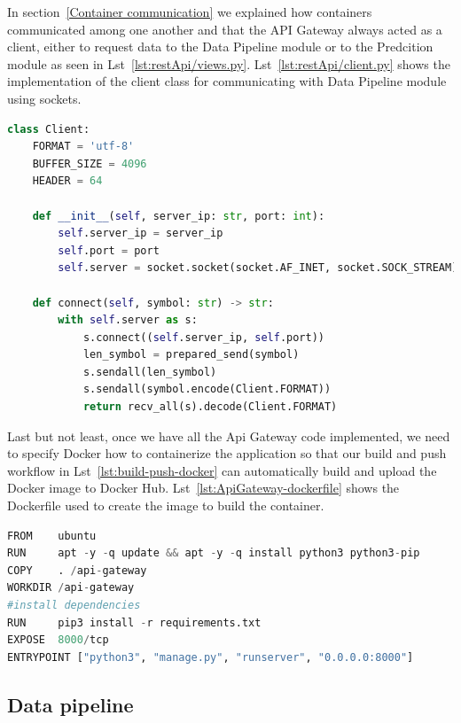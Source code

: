 In section~\ref{Container communication} we explained how containers communicated among one another and that the API Gateway always acted as a client, either to request data to the Data Pipeline module or to the Predcition module as seen in Lst~\ref{lst:restApi/views.py}. Lst~\ref{lst:restApi/client.py} shows the implementation of the client class for communicating with Data Pipeline module using sockets.

\begin{lstlisting}[language=python,caption=restApi/client.py,label={lst:restApi/client.py}]
class Client:
    FORMAT = 'utf-8'
    BUFFER_SIZE = 4096
    HEADER = 64

    def __init__(self, server_ip: str, port: int):
        self.server_ip = server_ip
        self.port = port
        self.server = socket.socket(socket.AF_INET, socket.SOCK_STREAM)

    def connect(self, symbol: str) -> str:
        with self.server as s:
            s.connect((self.server_ip, self.port))
            len_symbol = prepared_send(symbol)
            s.sendall(len_symbol)
            s.sendall(symbol.encode(Client.FORMAT))
            return recv_all(s).decode(Client.FORMAT)

\end{lstlisting}

Last but not least, once we have all the Api Gateway code implemented, we need to specify Docker how to containerize the application so that our build and push workflow in Lst~\ref{lst:build-push-docker} can automatically build and upload the Docker image to Docker Hub. Lst~\ref{lst:ApiGateway-dockerfile} shows the Dockerfile used to create the image to build the container. 


\begin{lstlisting}[language=python,caption=Api Gateway Dockerfile,label={lst:ApiGateway-dockerfile}]
FROM    ubuntu
RUN     apt -y -q update && apt -y -q install python3 python3-pip
COPY    . /api-gateway 
WORKDIR /api-gateway
#install dependencies
RUN     pip3 install -r requirements.txt 
EXPOSE  8000/tcp
ENTRYPOINT ["python3", "manage.py", "runserver", "0.0.0.0:8000"] 
\end{lstlisting}

\subsection{Data pipeline}

